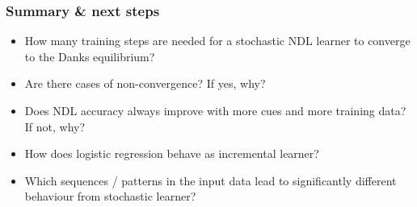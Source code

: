 \begin{frame}
  \frametitle{Summary \& next steps}
  \begin{center}
    \setlength{\fboxrule}{1pt}
  \end{center}
  
  \begin{itemize}
  \item<2-> How many training steps are needed for a stochastic NDL learner to
    converge to the Danks equilibrium?
  \item<3-> Are there cases of non-convergence? If yes, why?
  \item<4-> Does NDL accuracy always improve with more cues and more training data?
      If not, why?
  \item<5-> How does logistic regression behave as incremental learner?
  \item<6-> Which sequences / patterns in the input data lead to significantly
    different behaviour from stochastic learner?
  \end{itemize}

\end{frame}

